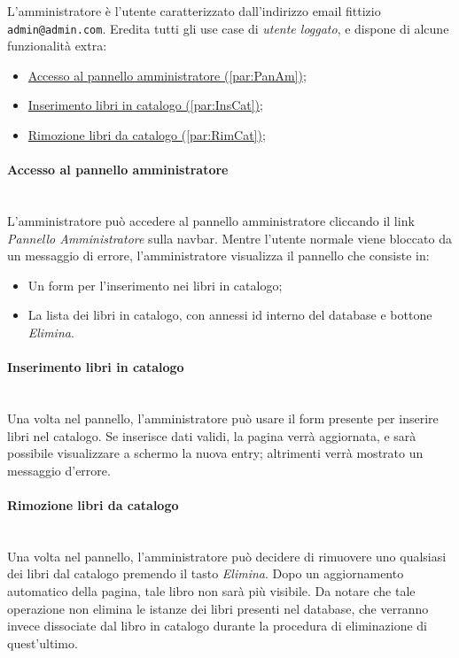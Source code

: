 L'amministratore è l'utente caratterizzato dall'indirizzo email fittizio \texttt{admin@admin.com}. Eredita tutti gli use case di \textit{utente loggato}, e dispone di alcune funzionalità extra:
\begin{itemize}
	\item \hyperref[par:PanAm]{Accesso al pannello amministratore (\ref{par:PanAm})};
	\item \hyperref[par:InsCat]{Inserimento libri in catalogo (\ref{par:InsCat})};
	\item \hyperref[par:RimCat]{Rimozione libri da catalogo (\ref{par:RimCat})};
\end{itemize}

\paragraph{Accesso al pannello amministratore}\mbox{}\\
\label{par:PanAm}
L'amministratore può accedere al pannello amministratore cliccando il link \textit{Pannello Amministratore} sulla navbar. Mentre l'utente normale viene bloccato da un messaggio di errore, l'amministratore visualizza il pannello che consiste in:
\begin{itemize}
	\item Un form per l'inserimento nei libri in catalogo;
	\item La lista dei libri in catalogo, con annessi id interno del database e bottone \textit{Elimina}.
\end{itemize}

\paragraph{Inserimento libri in catalogo}\mbox{}\\
\label{par:InsCat}
Una volta nel pannello, l'amministratore può usare il form presente per inserire libri nel catalogo. Se inserisce dati validi, la pagina verrà aggiornata, e sarà possibile visualizzare a schermo la nuova entry; altrimenti verrà mostrato un messaggio d'errore.

\paragraph{Rimozione libri da catalogo}\mbox{}\\
\label{par:RimCat}
Una volta nel pannello, l'amministratore può decidere di rimuovere uno qualsiasi dei libri dal catalogo premendo il tasto \textit{Elimina}. Dopo un aggiornamento automatico della pagina, tale libro non sarà più visibile. Da notare che tale operazione non elimina le istanze dei libri presenti nel database, che verranno invece dissociate dal libro in catalogo durante la procedura di eliminazione di quest'ultimo.

